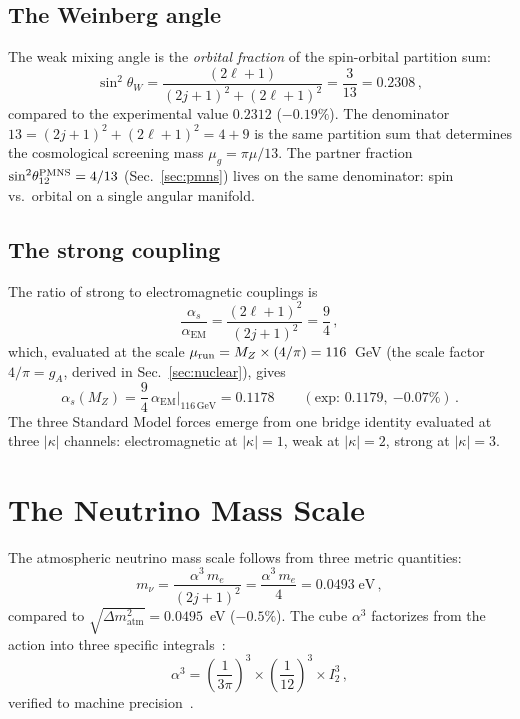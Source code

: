 \documentclass[aps,prd,twocolumn,superscriptaddress,nofootinbib,longbibliography]{revtex4-2}
\newcommand{\mug}{\mu_g}
\newcommand{\aEM}{\alpha_{\mathrm{EM}}}
\begin{document}
\subsection{The Weinberg angle}

The weak mixing angle is the \emph{orbital fraction} of the
spin-orbital partition sum:
\begin{equation}\label{eq:weinberg}
  \sin^2\!\theta_W = \frac{(2\ell+1)}{(2j+1)^2 + (2\ell+1)^2}
  = \frac{3}{13} = 0.2308\,,
\end{equation}
compared to the experimental value $0.2312$ ($-0.19\%$).  The
denominator $13 = (2j+1)^2 + (2\ell+1)^2 = 4 + 9$ is the same
partition sum that determines the cosmological screening mass
$\mug = \pi\mu/13$.  The partner fraction
$\sin^2\!\theta_{12}^{\rm PMNS} = 4/13$ (Sec.~\ref{sec:pmns})
lives on the same denominator: spin vs.\ orbital on a single
angular manifold.

\subsection{The strong coupling}

The ratio of strong to electromagnetic couplings is
\begin{equation}\label{eq:alpha-ratio}
  \frac{\alpha_s}{\aEM} = \frac{(2\ell+1)^2}{(2j+1)^2}
  = \frac{9}{4}\,,
\end{equation}
which, evaluated at the scale $\mu_{\rm run} = M_Z \times (4/\pi)
= 116$~GeV (the scale factor $4/\pi = g_A$, derived in
Sec.~\ref{sec:nuclear}), gives
\begin{equation}
  \alpha_s(M_Z) = \frac{9}{4}\,\aEM\bigg|_{116\,\text{GeV}}
  = 0.1178
  \qquad(\text{exp: }0.1179,\ {-0.07\%})\,.
\end{equation}
The three Standard Model forces emerge from one bridge identity
evaluated at three $|\kappa|$ channels: electromagnetic at
$|\kappa| = 1$, weak at $|\kappa| = 2$, strong at $|\kappa| = 3$.

\section{The Neutrino Mass Scale}\label{sec:neutrino}

The atmospheric neutrino mass scale follows from three metric
quantities:
\begin{equation}\label{eq:mnu}
  m_\nu = \frac{\alpha^3\,m_e}{(2j+1)^2}
  = \frac{\alpha^3\,m_e}{4}
  = 0.0493\;\mathrm{eV}\,,
\end{equation}
compared to $\sqrt{\Delta m^2_{\mathrm{atm}}} = 0.0495$~eV
($-0.5\%$).  The cube $\alpha^3$ factorizes from the action into three
specific integrals~\cite{zenodo2025}:
\begin{equation}\label{eq:alpha3}
  \alpha^3 = \left(\frac{1}{3\pi}\right)^{\!3}
    \times \left(\frac{1}{12}\right)^{\!3}
    \times I_2^3\,,
\end{equation}
verified to machine precision~\cite{GellMann1964}.
\end{document}
